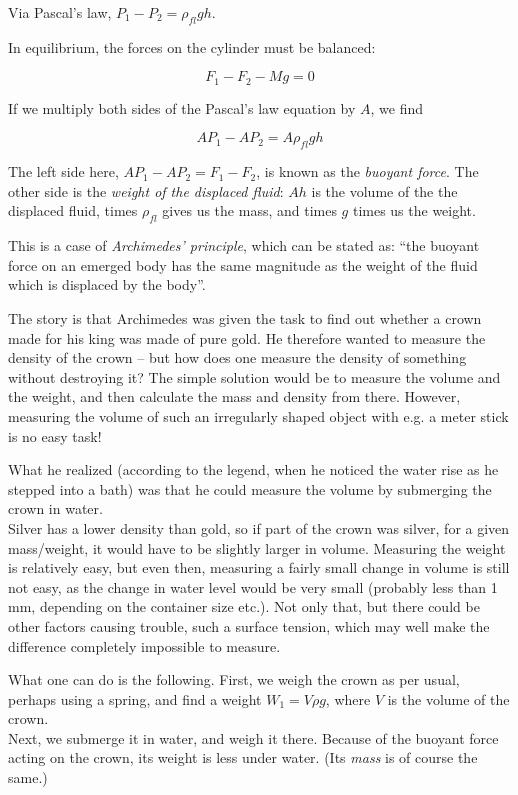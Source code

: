Via Pascal's law, $P_1 - P_2 = \rho_{fl} g h$.

In equilibrium, the forces on the cylinder must be balanced:

\begin{equation}
F_1 - F_2 - M g = 0
\end{equation}

If we multiply both sides of the Pascal's law equation by $A$, we find

\begin{equation}
A P_1 - A P_2 = A \rho_{fl} g h
\end{equation}

The left side here, $A P_1 - A P_2 = F_1 - F_2$, is known as the \emph{buoyant force}. The other side is the \emph{weight of the displaced fluid}: $A h$ is the volume of the the displaced fluid, times $\rho_{fl}$ gives us the mass, and times $g$ times us the weight.

This is a case of \emph{Archimedes' principle}, which can be stated as: ``the buoyant force on an emerged body has the same magnitude as the weight of the fluid which is displaced by the body''.

The story is that Archimedes was given the task to find out whether a crown made for his king was made of pure gold. He therefore wanted to measure the density of the crown -- but how does one measure the density of something without destroying it? The simple solution would be to measure the volume and the weight, and then calculate the mass and density from there. However, measuring the volume of such an irregularly shaped object with e.g. a meter stick is no easy task!

What he realized (according to the legend, when he noticed the water rise as he stepped into a bath) was that he could measure the volume by submerging the crown in water.\\
Silver has a lower density than gold, so if part of the crown was silver, for a given mass/weight, it would have to be slightly larger in volume. Measuring the weight is relatively easy, but even then, measuring a fairly small change in volume is still not easy, as the change in water level would be very small (probably less than 1 mm, depending on the container size etc.). Not only that, but there could be other factors causing trouble, such a surface tension, which may well make the difference completely impossible to measure.

What one can do is the following. First, we weigh the crown as per usual, perhaps using a spring, and find a weight $W_1 = V \rho g$, where $V$ is the volume of the crown.\\
Next, we submerge it in water, and weigh it there. Because of the buoyant force acting on the crown, its weight is less under water. (Its \emph{mass} is of course the same.)

